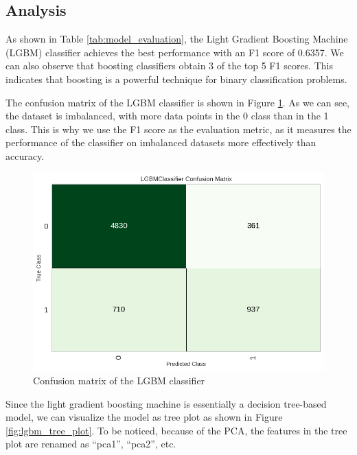 \documentclass[conference]{IEEEtran}
\begin{document}
\subsection{Analysis}

As shown in Table \ref{tab:model_evaluation}, the Light Gradient Boosting Machine (LGBM) classifier achieves the best performance with an F1 score of 0.6357.
We can also observe that boosting classifiers obtain 3 of the top 5 F1 scores.
This indicates that boosting is a powerful technique for binary classification problems.

The confusion matrix of the LGBM classifier is shown in Figure \ref{fig:confusion_matrix}.
As we can see, the dataset is imbalanced, with more data points in the 0 class than in the 1 class.
This is why we use the F1 score as the evaluation metric, as it measures the performance of the classifier on imbalanced datasets more effectively than accuracy.

\begin{figure}[!ht]
    \centering
    \includegraphics[width=\linewidth]{figure/Confusion Matrix.png}
    \caption{Confusion matrix of the LGBM classifier}
    \label{fig:confusion_matrix}
\end{figure}

Since the light gradient boosting machine is essentially a decision tree-based model, we can visualize the model as tree plot as shown in Figure \ref{fig:lgbm_tree_plot}.
To be noticed, because of the PCA, the features in the tree plot are renamed as ``pca1'', ``pca2'', etc.
\end{document}

